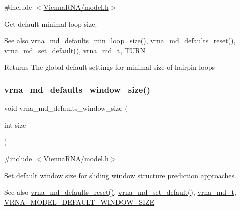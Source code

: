 {\ttfamily \#include $<$\hyperlink{model_8h}{Vienna\+R\+N\+A/model.\+h}$>$}



Get default minimal loop size. 

\begin{DoxySeeAlso}{See also}
\hyperlink{group__model__details_gac152f1e78c1058a10261022c8dfda0f7}{vrna\+\_\+md\+\_\+defaults\+\_\+min\+\_\+loop\+\_\+size()}, \hyperlink{group__model__details_ga70834424cf804d149937de89f80ceb45}{vrna\+\_\+md\+\_\+defaults\+\_\+reset()}, \hyperlink{group__model__details_ga8ac6ff84936282436f822644bf841f66}{vrna\+\_\+md\+\_\+set\+\_\+default()}, \hyperlink{group__model__details_ga1f8a10e12a0a1915f2a4eff0b28ea17c}{vrna\+\_\+md\+\_\+t}, \hyperlink{energy__const_8h_ae646250fd59311356c7e5722a81c3a96}{T\+U\+RN} 
\end{DoxySeeAlso}
\begin{DoxyReturn}{Returns}
The global default settings for minimal size of hairpin loops 
\end{DoxyReturn}
\mbox{\label{group__model__details_ga7b802ce0e8c3181bf5cb580de6d5b26a}} 
\subsubsection{\texorpdfstring{vrna\+\_\+md\+\_\+defaults\+\_\+window\+\_\+size()}{vrna\_md\_defaults\_window\_size()}}
{\footnotesize\ttfamily void vrna\+\_\+md\+\_\+defaults\+\_\+window\+\_\+size (\begin{DoxyParamCaption}\item[{int}]{size }\end{DoxyParamCaption})}



{\ttfamily \#include $<$\hyperlink{model_8h}{Vienna\+R\+N\+A/model.\+h}$>$}



Set default window size for sliding window structure prediction approaches. 

\begin{DoxySeeAlso}{See also}
\hyperlink{group__model__details_ga70834424cf804d149937de89f80ceb45}{vrna\+\_\+md\+\_\+defaults\+\_\+reset()}, \hyperlink{group__model__details_ga8ac6ff84936282436f822644bf841f66}{vrna\+\_\+md\+\_\+set\+\_\+default()}, \hyperlink{group__model__details_ga1f8a10e12a0a1915f2a4eff0b28ea17c}{vrna\+\_\+md\+\_\+t}, \hyperlink{group__model__details_ga8de04a9cb57e811e313b0f9f207f6bdb}{V\+R\+N\+A\+\_\+\+M\+O\+D\+E\+L\+\_\+\+D\+E\+F\+A\+U\+L\+T\+\_\+\+W\+I\+N\+D\+O\+W\+\_\+\+S\+I\+ZE} 
\end{DoxySeeAlso}

